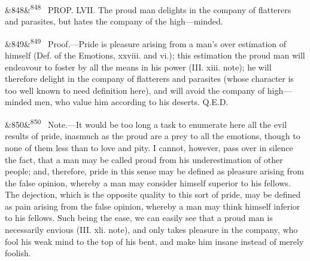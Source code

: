 \documentclass[12pt]{article}
\newcommand{\para}[1][]{\par\noindent\ifx&#1&\else\textsuperscript{\footnotesize #1}~\fi}
\begin{document}
\para[848] PROP. LVII. The proud man delights in the company of flatterers and parasites, but hates the company of the high---minded.

\para[849] Proof.---Pride is pleasure arising from a man's over estimation of himself (Def. of the Emotions, xxviii. and vi.); this estimation the proud man will endeavour to foster by all the means in his power (III. xiii. note); he will therefore delight in the company of flatterers and parasites (whose character is too well known to need definition here), and will avoid the company of high---minded men, who value him according to his deserts. Q.E.D.

\para[850] Note.---It would be too long a task to enumerate here all the evil results of pride, inasmuch as the proud are a prey to all the emotions, though to none of them less than to love and pity. I cannot, however, pass over in silence the fact, that a man may be called proud from his underestimation of other people; and, therefore, pride in this sense may be defined as pleasure arising from the false opinion, whereby a man may consider himself superior to his fellows. The dejection, which is the opposite quality to this sort of pride, may be defined as pain arising from the false opinion, whereby a man may think himself inferior to his fellows. Such being the ease, we can easily see that a proud man is necessarily envious (III. xli. note), and only takes pleasure in the company, who fool his weak mind to the top of his bent, and make him insane instead of merely foolish.
\end{document}
